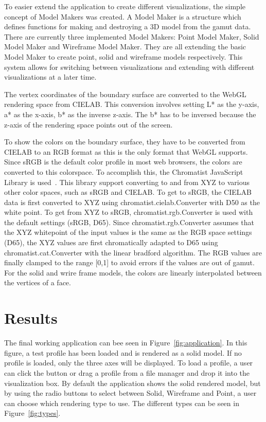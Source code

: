 To easier extend the application to create different visualizations, the simple concept of Model Makers was created.
A Model Maker is a structure which defines functions for making and destroying a 3D model from the gamut data.
There are currently three implemented Model Makers: Point Model Maker, Solid Model Maker and Wireframe Model Maker.
They are all extending the basic Model Maker to create point, solid and wireframe models respectively.
This system allows for switching between visualizations and extending with different visualizations at a later time.

The vertex coordinates of the boundary surface are converted to the WebGL rendering space from CIELAB.
This conversion involves setting L* as the y-axis, a* as the x-axis, b* as the inverse z-axis.
The b* has to be inversed because the z-axis of the rendering space points out of the screen.

To show the colors on the boundary surface, they have to be converted from CIELAB to an RGB format as this is the only format that WebGL supports.
Since sRGB is the default color profile in most web browsers, the colors are converted to this colorspace.
To accomplish this, the Chromatist JavaScript Library is used~\cite{Chromatist}.
This library support converting to and from XYZ to various other color spaces, such as sRGB and CIELAB.
To get to sRGB, the CIELAB data is first converted to XYZ using chromatist.cielab.Converter with D50 as the white point.
To get from XYZ to sRGB, chromatist.rgb.Converter is used with the default settings (sRGB, D65).
Since chromatist.rgb.Converter assumes that the XYZ whitepoint of the input values is the same as the RGB space settings (D65), the XYZ values are first chromatically adapted to D65 using chromatist.cat.Converter with the linear bradford algorithm.
The RGB values are finally clamped to the range [0,1] to avoid errors if the values are out of gamut.
For the solid and wrire frame models, the colors are linearly interpolated between the vertices of a face.

\section{Results}
The final working application can bee seen in Figure~\ref{fig:application}.
In this figure, a test profile has been loaded and is rendered as a solid model.
If no profile is loaded, only the three axes will be displayed.
To load a profile, a user can click the  button or drag a profile from a file manager and drop it into the visualization box.
By default the application shows the solid rendered model, but by using the radio buttons to select between Solid, Wireframe and Point, a user can choose which rendering type to use.
The different types can be seen in Figure~\ref{fig:types}.

